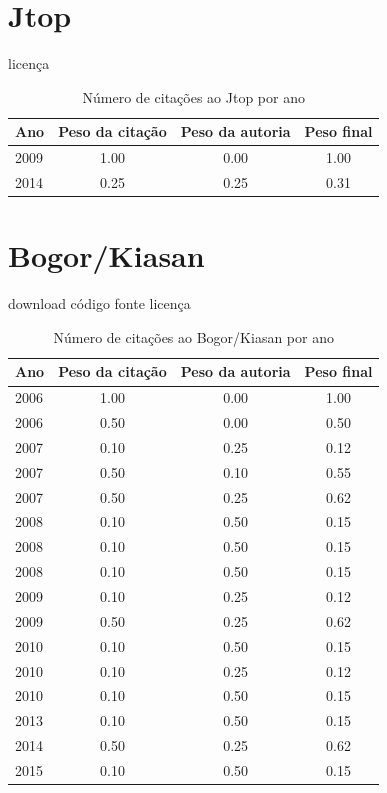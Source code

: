 \section{Jtop}
\checkmark licença
\begin{table}[H]
\caption{Número de citações ao Jtop por ano}
\centering
\begin{tabular}{| l | c | c | c |}
  \hline
  Ano & Peso da citação & Peso da autoria & Peso final \\
  \hline
  2009
    & 1.00
    & 0.00
    & {\color{blue} 1.00} \\
\hline
  2014
    & 0.25
    & 0.25
    & {\color{red} 0.31} \\
\hline
\end{tabular}
\end{table}
\section{Bogor/Kiasan}
\checkmark download
\checkmark código fonte
\checkmark licença
\begin{table}[H]
\caption{Número de citações ao Bogor/Kiasan por ano}
\centering
\begin{tabular}{| l | c | c | c |}
  \hline
  Ano & Peso da citação & Peso da autoria & Peso final \\
  \hline
  2006
    & 1.00
    & 0.00
    & {\color{blue} 1.00} \\
  2006
    & 0.50
    & 0.00
    & {\color{blue} 0.50} \\
\hline
  2007
    & 0.10
    & 0.25
    & {\color{red} 0.12} \\
  2007
    & 0.50
    & 0.10
    & {\color{blue} 0.55} \\
  2007
    & 0.50
    & 0.25
    & {\color{blue} 0.62} \\
\hline
  2008
    & 0.10
    & 0.50
    & {\color{red} 0.15} \\
  2008
    & 0.10
    & 0.50
    & {\color{red} 0.15} \\
  2008
    & 0.10
    & 0.50
    & {\color{red} 0.15} \\
\hline
  2009
    & 0.10
    & 0.25
    & {\color{red} 0.12} \\
  2009
    & 0.50
    & 0.25
    & {\color{blue} 0.62} \\
\hline
  2010
    & 0.10
    & 0.50
    & {\color{red} 0.15} \\
  2010
    & 0.10
    & 0.25
    & {\color{red} 0.12} \\
  2010
    & 0.10
    & 0.50
    & {\color{red} 0.15} \\
\hline
  2013
    & 0.10
    & 0.50
    & {\color{red} 0.15} \\
\hline
  2014
    & 0.50
    & 0.25
    & {\color{blue} 0.62} \\
\hline
  2015
    & 0.10
    & 0.50
    & {\color{red} 0.15} \\
\hline
\end{tabular}
\end{table}
